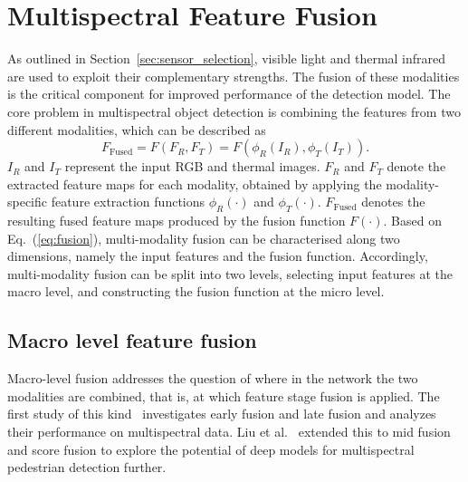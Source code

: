 \documentclass[12pt,oneside,bibtotoc,liststotoc]{scrbook}
\begin{document}
\vspace{-2em}
\section{Multispectral Feature Fusion}
\vspace{-0.5em}

As outlined in Section~\ref{sec:sensor_selection}, visible light and thermal
infrared are used to exploit their complementary strengths. The fusion of these modalities
is the critical component for improved performance of the detection model.
The core problem in multispectral object detection is combining
the features from two different modalities, which can be described as
\begin{equation}
    F_{\text{Fused}} = F(F_R, F_T) = F(\phi_R(I_R), \phi_T(I_T)).
    \label{eq:fusion}
\end{equation}
$I_R$ and $I_T$ represent the input RGB and thermal images.
$F_R$ and $F_T$ denote the extracted feature maps for each modality,
obtained by applying the modality-specific feature extraction functions
$\phi_R(\cdot)$ and $\phi_T(\cdot)$. $F_{\text{Fused}}$ denotes the resulting
fused feature maps produced by the fusion function $F(\cdot)$.
Based on Eq.~(\ref{eq:fusion}), multi-modality fusion can be characterised
along two dimensions, namely the input features and the fusion function.
Accordingly, multi-modality fusion can be split into two levels,
selecting input features at the macro level, and constructing
the fusion function at the micro level.~\cite{qingyun2021CFT}

\vspace{-1em}
\subsection{Macro level feature fusion}

Macro-level fusion addresses the question of where in the network the
two modalities are combined, that is, at which feature stage fusion
is applied. The first study of
this kind~\cite{wagner2016multispectralDetectionDeepFusion} investigates
early fusion and late fusion and analyzes their
performance on multispectral data. Liu et al.~\cite{liu2016multispectralDeepNeuralNetworks}
extended this to mid fusion and score fusion to explore the
potential of deep models for multispectral pedestrian detection further.
\end{document}
